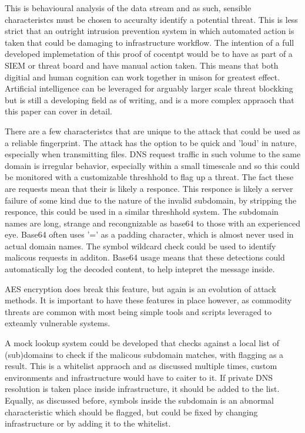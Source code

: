 This is behavioural analysis of the data stream and as such, sensible characteristcs must be chosen to accuralty identify a potential threat. This is less strict that an outright intrusion prevention system in which automated action is taken that could be damaging to infrastructure workflow. The intention of a full developed implemetation of this proof of cocentpt would be to have as part of a SIEM or threat board and have manual action taken. This means that both digitial and human cognition can work together in unison for greatest effect.
Artificial intelligence can be leveraged for arguably larger scale threat blockking but is still a developing field as of writing, and is a more complex appraoch that this paper can cover in detail.

There are a few characteristcs that are unique to the attack that could be used as a reliable fingerprint. The attack has the option to be quick and 'loud' in nature, especially when transmitting files. DNS request traffic in such volume to the same domain is irregular behavior, especially within a small timescale and so this could be monitored with a customizable threshhold to flag up a threat.
The fact these are requests mean that their is likely a responce. This responce is likely a server failure of some kind due to the nature of the invalid subdomain, by stripping the responce, this could be used in a similar threshhold system. The subdomain names are long, strange and recongnizable as base64 to those with an experienced eye. Base64 often uses '=' as a padding character, which is almost never used in actual domain names. The symbol wildcard check could be used to identify malicous requests in additon. Base64 usage means that these detections could automatically log the decoded content, to help intepret the message inside.

AES encryption does break this feature, but again is an evolution of attack methods. It is important to have these features in place however, as commodity threats are common with most being simple tools and scripts leveraged to exteamly vulnerable systems. 

A mock lookup system could be developed that checks against a local list of (sub)domains to check if the malicous subdomain matches, with flagging as a result. This is a whitelist appraoch and as discussed multiple times, custom environments and infrastructure would have to caiter to it. If private DNS resolution is taken place inside infrastructure, it should be added to the list. Equally, as discussed before, symbols inside the subdomain is an abnormal characteristic which should be flagged, but could be fixed by changing infrastructure or by adding it to the whitelist. 

